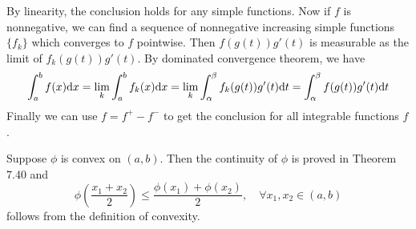 \begin{exercise}{7.11}
   
   By linearity, the conclusion holds for any simple functions. Now if $f$ is nonnegative, we can find a sequence of nonnegative increasing simple functions $\{f_k\}$ which converges to $f$ pointwise. Then $f(g(t))g'(t)$ is measurable as the limit of $f_k(g(t))g'(t)$. By dominated convergence theorem, we have
   \[
     \int_a^bf(x)\mathrm{d} x=\lim_k\int_a^bf_k(x)\mathrm{d} x=\lim_k\int_\alpha^\beta f_k(g(t))g'(t)\mathrm{d} t=\int_\alpha^\beta f(g(t))g'(t)\mathrm{d} t
   \]
   Finally we can use $f=f^+-f^-$ to get the conclusion for all integrable functions $f$.
 \end{exercise}
 
 
\begin{exercise}{7.14}
	Suppose $\phi$ is convex on $(a,b)$. Then the continuity of $\phi$ is proved in Theorem 7.40 and 
	\begin{equation}\label{714}
			\phi\left(\frac{x_1+x_2}{2}\right)\leq \frac{\phi(x_1)+\phi(x_2)}{2},\quad\forall x_1,x_2\in(a,b)
	\end{equation}
	follows from the definition of convexity.
	

\end{exercise}
